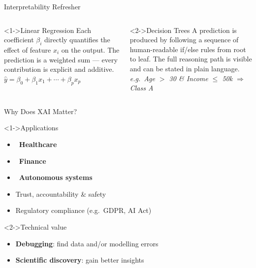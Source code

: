 \documentclass[aspectratio=169]{beamer}
\begin{document}
\begin{frame}{Interpretability Refresher}
  \begin{columns}[T]
      \begin{block}<1->{Linear Regression}
Each coefficient $\beta_i$ directly quantifies the effect of
        feature $x_i$ on the output. The prediction is a weighted sum
        --- every contribution is explicit and additive.\\[0.4em]
        \textit{$\hat{y} = \beta_0 + \beta_1 x_1 + \cdots + \beta_p x_p$}
      \end{block}
      \begin{block}<2->{Decision Trees}
A prediction is produced by following a sequence of
        human-readable if/else rules from root to leaf. The full
        reasoning path is visible and can be stated in plain
        language.\\[0.4em]
        \textit{e.g.\ Age $>$ 30 \& Income $\leq$ 50k $\Rightarrow$ Class A}
      \end{block}
  \end{columns}
\end{frame}

\begin{frame}{Why Does XAI Matter?}
  \begin{block}<1->{Applications}
    \begin{itemize}
      \item \faHospital\ \textbf{Healthcare}
      \item \faChartBar\ \textbf{Finance}
      \item \faCar\ \textbf{Autonomous systems}
      \item Trust, accountability \& safety
      \item Regulatory compliance (e.g.\ GDPR, AI Act)
    \end{itemize}
  \end{block}
  \vspace{0.4em}
  \begin{block}<2->{Technical value}
    \begin{itemize}
      \item \textbf{Debugging}: find data and/or modelling errors
      \item \textbf{Scientific discovery}: gain better insights
    \end{itemize}
  \end{block}
\end{frame}
\end{document}
